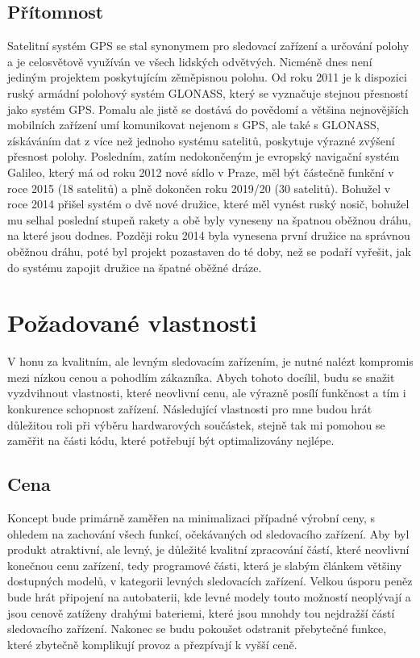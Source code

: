 \documentclass[FM,BP]{tulthesis}
\begin{document}
\subsection{Přítomnost}
Satelitní systém GPS se stal synonymem pro sledovací zařízení a určování polohy a je celosvětově využíván ve všech lidských odvětvých. Nicméně dnes není jediným projektem poskytujícím zěměpisnou polohu. Od roku 2011 je k dispozici ruský armádní polohový systém GLONASS, který se vyznačuje stejnou přesností jako systém GPS. Pomalu ale jistě se dostává do povědomí a většina nejnovějších mobilních zařízení umí komunikovat nejenom s GPS, ale také s GLONASS, získáváním dat z více než jednoho systému satelitů, poskytuje výrazné zvýšení přesnost polohy. Posledním, zatím nedokončeným je evropský navigační systém Galileo, který má od roku 2012 nové sídlo v Praze, měl být částečně funkční v roce 2015 (18 satelitů) a plně dokončen roku 2019/20 (30 satelitů). Bohužel v roce 2014 přišel systém o dvě nové družice, které měl vynést ruský nosič, bohužel mu selhal poslední stupeň rakety a obě byly vyneseny na špatnou oběžnou dráhu, na které jsou dodnes. Později roku 2014 byla vynesena první družice na správnou oběžnou dráhu, poté byl projekt pozastaven do té doby, než se podaří vyřešit, jak do systému zapojit družice na špatné oběžné dráze.

\section{Požadované vlastnosti}
V honu za kvalitním, ale levným sledovacím zařízením, je nutné nalézt kompromis mezi nízkou cenou a pohodlím zákazníka. Abych tohoto docílil, budu se snažit vyzdvihnout vlastnosti, které neovlivní cenu, ale výrazně posílí funkčnost a tím i konkurence schopnost zařízení. Následující vlastnosti pro mne budou hrát důležitou roli při výběru hardwarových součástek, stejně tak mi pomohou se zaměřit na části kódu, které potřebují být optimalizovány nejlépe.

\subsection{Cena}
Koncept bude primárně zaměřen na minimalizaci případné výrobní ceny, s ohledem na zachování všech funkcí, očekávaných od sledovacího zařízení. Aby byl produkt atraktivní, ale levný, je důležité kvalitní zpracování částí, které neovlivní konečnou cenu zařízení, tedy programové části, která je slabým článkem většiny dostupných modelů, v kategorii levných sledovacích zařízení. Velkou úsporu peněz bude hrát připojení na autobaterii, kde levné modely touto možností neoplývají a jsou cenově zatíženy drahými bateriemi, které jsou mnohdy tou nejdražší částí sledovacího zařízení. Nakonec se budu pokoušet odstranit přebytečné funkce, které zbytečně komplikují provoz a přezpívají k vyšší ceně.
\end{document}
